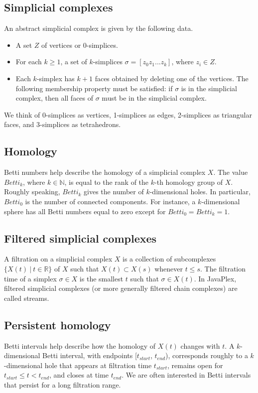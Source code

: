 \documentclass[amscd, amssymb, verbatim]{amsart}[12pt]
\theoremstyle{remark}
\theoremstyle{remark}
\theoremstyle{remark}
\begin{document}
\subsection{Simplicial complexes}
An abstract simplicial complex is given by the following data.
\begin{itemize}
\item A set $Z$ of vertices or 0-simplices.
\item For each $k\geq 1$, a set of $k$-simplices $\sigma = [z_0z_1...z_k]$, where $z_i\in Z$.
\item Each $k$-simplex has $k+1$ faces obtained by deleting one of the vertices. The following membership property must be satisfied: if $\sigma$ is in the simplicial complex, then all faces of $\sigma$ must be in the simplicial complex.
\end{itemize}
We think of 0-simplices as vertices, 1-simplices as edges, 2-simplices as triangular faces, and 3-simplices as tetrahedrons. 


\subsection{Homology}
Betti numbers help describe the homology of a simplicial complex $X$. The value $Betti_k$, where $k\in \mathbb{N}$, is equal to the rank of the $k$-th homology group of $X$. Roughly speaking, $Betti_k$ gives the number of $k$-dimensional holes. In particular, $Betti_0$ is the number of connected components. For instance, a $k$-dimensional sphere has all Betti numbers equal to zero except for $Betti_0 = Betti_k = 1$. 


\subsection{Filtered simplicial complexes}
A filtration on a simplicial complex $X$ is a collection of subcomplexes $\{X(t) \ |\ t\in \mathbb{R}\}$ of $X$ such that $X(t) \subset X(s)$ whenever $t\leq s$. The filtration time of a simplex $\sigma \in X$ is the smallest $t$ such that $\sigma \in X(t)$. In JavaPlex, filtered simplicial complexes (or more generally filtered chain complexes) are called streams. 


\subsection{Persistent homology}
Betti intervals help describe how the homology of $X(t)$ changes with $t$. A $k$-dimensional Betti interval, with endpoints [$t_{start}$, $t_{end}$), corresponds roughly to a $k$-dimensional hole that appears at filtration time $t_{start}$, remains open for $t_{start} \leq t < t_{end}$, and closes at time $t_{end}$. We are often interested in Betti intervals that persist for a long filtration range. 
\end{document}
